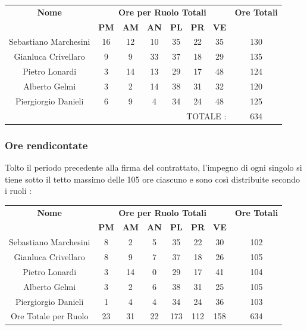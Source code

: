 \documentclass[12pt,a4paper,titlepage]{article}
\begin{document}
	{\renewcommand\arraystretch{1.2} %
		\begin{tabular}{|c|c|c|c|c|c|c|c|}
			\hline 
			\textbf{Nome} & \multicolumn{6}{c|}{\textbf{Ore per Ruolo Totali}} & \textbf{Ore Totali} \\ 
			& \textbf{PM} & \textbf{AM} & \textbf{AN} & \textbf{PL} & \textbf{PR} & \textbf{VE} & \\ 
			\hline
			Sebastiano Marchesini	& 16 & 12 & 10 & 35 & 22 & 35 & 130 \\ 
			\hline 
			Gianluca Crivellaro 	& 9 & 9 & 33 & 37 & 18 & 29 & 135 \\ 
			\hline 
			Pietro Lonardi 			& 3 & 14 & 13 & 29 & 17 & 48 & 124 \\ 
			\hline 
			Alberto Gelmi 			& 3 & 2 & 14 & 38 & 31 & 32 & 120 \\ 
			\hline 
			Piergiorgio Danieli 	& 6 & 9 & 4 & 34 & 24 & 48 & 125 \\ 
			\hline 
			\multicolumn{7}{r|}{TOTALE :} & 634 \\ 
	\end{tabular}}

	\subsubsection{Ore rendicontate}
	Tolto il periodo precedente alla firma del contrattato, l'impegno di ogni singolo si tiene sotto il tetto massimo delle 105 ore ciascuno e sono così distribuite secondo i ruoli :\\
	
	{\renewcommand\arraystretch{1.2} %
		\begin{tabular}{|c|c|c|c|c|c|c|c|}
			\hline 
			\textbf{Nome} & \multicolumn{6}{c|}{\textbf{Ore per Ruolo Totali}} & \textbf{Ore Totali} \\ 
			& \textbf{PM} & \textbf{AM} & \textbf{AN} & \textbf{PL} & \textbf{PR} & \textbf{VE} & \\ 
			\hline
			Sebastiano Marchesini	& 8 & 2 & 5 & 35 & 22 & 30 & 102 \\ 
			\hline 
			Gianluca Crivellaro 	& 8 & 9 & 7 & 37 & 18 & 26 & 105 \\ 
			\hline 
			Pietro Lonardi 			& 3 & 14 & 0 & 29 & 17 & 41 & 104 \\ 
			\hline 
			Alberto Gelmi 			& 3 & 2 & 6 & 38 & 31 & 25 & 105 \\ 
			\hline 
			Piergiorgio Danieli 	& 1 & 4 & 4 & 34 & 24 & 36 & 103 \\ 
			\hline 
			Ore Totale per Ruolo & 23 & 31 & 22 & 173 & 112 & 158 & 634 \\ 
	\end{tabular}}
\end{document}
